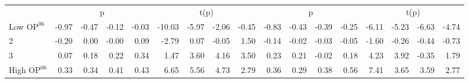 \begin{table}[!ht]
\begin{tabular}{lrrrrrrrrrrrrrrrr}
  
     & \multicolumn{4}{c}{p} & \multicolumn{4}{c}{t(p)}  & \multicolumn{4}{c}{p} & \multicolumn{4}{c}{t(p)}   \\
     \cmidrule(r){2-5} \cmidrule(r){6-9}  \cmidrule(r){10-13} \cmidrule(r){14-17} 
    Low $\text{OP}^{06}$  & -0.97  & -0.47  & -0.12  & -0.03  & -10.03  & -5.97  & -2.06  & -0.45  & -0.83  & -0.43  & -0.39  & -0.25  & -6.11  & -5.23  & -6.63  & -4.74   \\
    2  & -0.20  & 0.00  & -0.00  & 0.09  & -2.79  & 0.07  & -0.05  & 1.50  & -0.14  & -0.02  & -0.03  & -0.05  & -1.60  & -0.26  & -0.44  & -0.73   \\
    3  & 0.07  & 0.18  & 0.22  & 0.34  & 1.47  & 3.60  & 4.16  & 3.50  & 0.23  & 0.21  & -0.02  & 0.18  & 4.23  & 3.92  & -0.35  & 1.79   \\
    High $\text{OP}^{06}$  & 0.33  & 0.34  & 0.41  & 0.43  & 6.65  & 5.56  & 4.73  & 2.79  & 0.36  & 0.29  & 0.38  & 0.56  & 7.41  & 3.65  & 3.59  & 2.77   \\
    
  
  \bottomrule
\end{tabular}
\label{tbl:32_Size_BM_OP_B16}
\end{table}